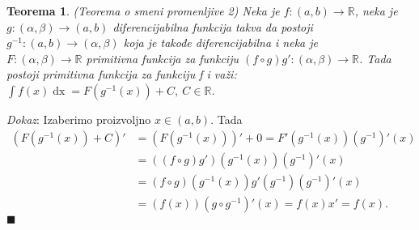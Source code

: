 \documentclass{article}
\newtheorem{teorema}{Teorema}[section]
\DeclareMathOperator{\dx}{dx}
\begin{document}
\begin{teoremabox}
    \label{teorema_1.3}
    \begin{teorema}
        (Teorema o smeni promenljive 2)
        Neka je $f:\left(a, b\right) \longrightarrow \mathbb{R}$, neka je
        $g:\left(\alpha, \beta\right) \longrightarrow \left(a, b\right)$
        diferencijabilna funkcija takva da postoji
        $g^{-1}:\left(a,b\right) \longrightarrow \left(\alpha, \beta\right)$
        koja je takođe diferencijabilna i neka je \\
        $F:\left(\alpha, \beta\right) \longrightarrow \mathbb{R}$
        primitivna funkcija za funkciju
        $\left(f\circ g\right) g' : \left(\alpha, \beta\right) \longrightarrow \mathbb{R}$.
        Tada postoji primitivna funkcija za funkciju f i važi:
        $\displaystyle\int f\left(x\right) \dx = F\left(g^{-1}\left(x\right)\right) + C,\ C \in \mathbb{R}$.
    \end{teorema}
\end{teoremabox}

\textit{Dokaz}: Izaberimo proizvoljno $x \in \left(a, b\right)$. Tada
\begin{align*}
    \left(F\left(g^{-1}\left(x\right)\right) + C\right)' & = \left(F\left(g^{-1}\left(x\right)\right)\right)' + 0 = F'\left(g^{-1}\left(x\right)\right) \left(g^{-1}\right)'\left(x\right)                                                                                                                                                      \\
                                                         & = \left(\left(f\circ g\right) g'\right)\left(g^{-1}\left(x\right)\right) \left(g^{-1}\right)'\left(x\right)                                                                                                                                                                          \\
                                                         & = \left(f\circ g\right)\left(g^{-1}\left(x\right)\right) g'\left(g^{-1}\right) \left(g^{-1}\right)'\left(x\right)                                                                                                                                                                    \\
                                                         & = \left(f\left(x\right)\right) \left(g \circ g^{-1}\right)'\left(x\right)                                                        = f\left(x\right) x'                                                                                                             = f\left(x\right).
\end{align*}
\null\hfill $\blacksquare$\par
\end{document}
